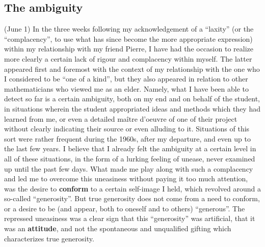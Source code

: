 \subsection{The ambiguity}

\label{note:63''}
(June 1) In the three weeks following my acknowledgement of a ``laxity'' (or the
``complacency'', to use what has since become the more appropriate expression)
within my relationship with my friend Pierre, 
I have had the occasion to realize more clearly a certain lack of rigour and complacency
within myself. The latter appeared first and foremost with the context of
my relationship with the one who I considered to be ``one of a kind'', 
but they also appeared in relation to other mathematicians who viewed me as an elder.
Namely, what I have been able to detect
so far is a certain ambiguity, both on my end and on behalf of the
student, in situations wherein the student appropriated ideas and methods which they had
learned from me, or even a detailed ma\^{i}tre d'oeuvre 
of one of their project without clearly indicating their source or even alluding to it.
Situations of this sort were rather frequent during the 1960s, after my
departure, and even up to the last few years.
I believe that I already felt the ambiguity at a certain level in all of these situations,
in the form of a lurking feeling of unease, never examined up until the past few days.
What made me play along with such a complacency and led me to overcome this uneasiness
without paying it too much attention, was the desire to \textbf{conform} to a certain
self-image I held, which revolved around a so-called ``generosity''.
But true generosity does not come from a need to conform, or a desire to be (and appear,
both to oneself and to others) ``generous''.
The repressed uneasiness was a clear sign that this ``generosity'' was artificial, that it
was an \textbf{attitude}, and not the spontaneous and unqualified gifting which
characterizes true generosity. 

